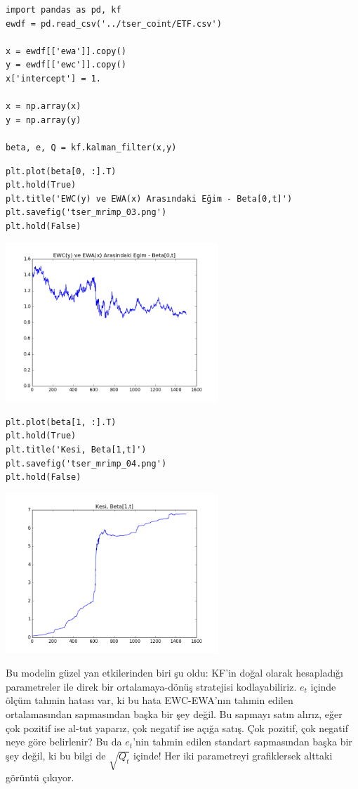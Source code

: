 \documentclass[12pt,fleqn]{article}\usepackage{../../common}
\begin{document}
\inputminted[fontsize=\footnotesize]{python}{kf.py}

\begin{verbatim}
import pandas as pd, kf
ewdf = pd.read_csv('../tser_coint/ETF.csv')

x = ewdf[['ewa']].copy()
y = ewdf[['ewc']].copy()
x['intercept'] = 1.

x = np.array(x)
y = np.array(y)

beta, e, Q = kf.kalman_filter(x,y)
\end{verbatim}

\begin{verbatim}
plt.plot(beta[0, :].T)
plt.hold(True)
plt.title('EWC(y) ve EWA(x) Arasındaki Eğim - Beta[0,t]')
plt.savefig('tser_mrimp_03.png')
plt.hold(False)
\end{verbatim}

\includegraphics[height=6cm]{tser_mrimp_03.png}

\begin{verbatim}
plt.plot(beta[1, :].T)
plt.hold(True)
plt.title('Kesi, Beta[1,t]')
plt.savefig('tser_mrimp_04.png')
plt.hold(False)
\end{verbatim}

\includegraphics[height=6cm]{tser_mrimp_04.png}

Bu modelin güzel yan etkilerinden biri şu oldu: KF'in doğal olarak
hesapladığı parametreler ile direk bir ortalamaya-dönüş stratejisi
kodlayabiliriz. $e_t$ içinde ölçüm tahmin hatası var, ki bu hata
EWC-EWA'nın tahmin edilen ortalamasından sapmasından başka bir şey
değil. Bu sapmayı satın alırız, eğer çok pozitif ise al-tut yaparız, çok
negatif ise açığa satış. Çok pozitif, çok negatif neye göre belirlenir? Bu
da $e_t$'nin tahmin edilen standart sapmasından başka bir şey değil, ki bu
bilgi de $\sqrt{Q_t}$ içinde! Her iki parametreyi grafiklersek alttaki
görüntü çıkıyor.
\end{document}
